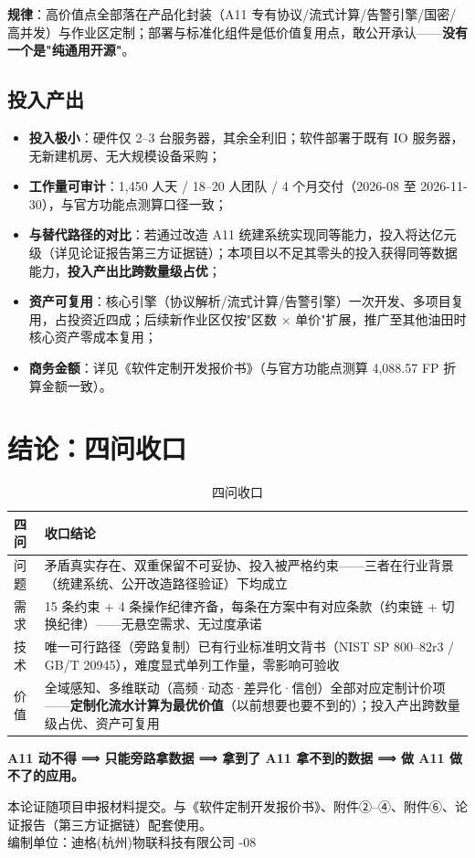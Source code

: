 \documentclass[11pt,a4paper]{ctexart}
\begin{document}
\textbf{规律}：高价值点全部落在产品化封装（A11 专有协议/流式计算/告警引擎/国密/高并发）与作业区定制；部署与标准化组件是低价值复用点，敢公开承认——\textbf{没有一个是"纯通用开源"}。

\subsection{投入产出}

\begin{itemize}[leftmargin=*]
  \item \textbf{投入极小}：硬件仅 2--3 台服务器，其余全利旧；软件部署于既有 IO 服务器，无新建机房、无大规模设备采购；
  \item \textbf{工作量可审计}：1,450 人天 / 18--20 人团队 / 4 个月交付（2026-08 至 2026-11-30），与官方功能点测算口径一致；
  \item \textbf{与替代路径的对比}：若通过改造 A11 统建系统实现同等能力，投入将达亿元级（详见论证报告第三方证据链）；本项目以不足其零头的投入获得同等数据能力，\textbf{投入产出比跨数量级占优}；
  \item \textbf{资产可复用}：核心引擎（协议解析/流式计算/告警引擎）一次开发、多项目复用，占投资近四成；后续新作业区仅按"区数 $\times$ 单价"扩展，推广至其他油田时核心资产零成本复用；
  \item \textbf{商务金额}：详见《软件定制开发报价书》（与官方功能点测算 4,088.57 FP 折算金额一致）。
\end{itemize}

\section{结论：四问收口}

\begin{table}[H]\centering
\caption{四问收口}
\begin{tabular}{p{1.6cm} p{12.2cm}}
\toprule
\textbf{四问} & \textbf{收口结论} \\
\midrule
问题 & 矛盾真实存在、双重保留不可妥协、投入被严格约束——三者在行业背景（统建系统、公开改造路径验证）下均成立 \\
需求 & 15 条约束 + 4 条操作纪律齐备，每条在方案中有对应条款（约束链 + 切换纪律）——无悬空需求、无过度承诺 \\
技术 & 唯一可行路径（旁路复制）已有行业标准明文背书（NIST SP 800--82r3 / GB/T 20945），难度显式单列工作量，零影响可验收 \\
价值 & 全域感知、多维联动（高频·动态·差异化·信创）全部对应定制计价项——\textbf{定制化流水计算为最优价值}（以前想要也要不到的）；投入产出跨数量级占优、资产可复用 \\
\bottomrule
\end{tabular}
\end{table}

\begin{center}
\large\textbf{A11 动不得 ⟹ 只能旁路拿数据 ⟹ 拿到了 A11 拿不到的数据 ⟹ 做 A11 做不了的应用。}
\end{center}

\vspace{1em}
\noindent\hrulefill

\begin{center}
\small 本论证随项目申报材料提交。与《软件定制开发报价书》、附件②--④、附件⑥、论证报告（第三方证据链）配套使用。\\
编制单位：迪格(杭州)物联科技有限公司 -08
\end{center}
\end{document}
